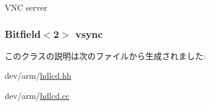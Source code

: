 \label{classHDLcd_a52d1b5d3426a30e18a452cd67d87ec13}
VNC server \hypertarget{classHDLcd_aacc2f986e357e2a77bd80683f3c976aa}{
\subsubsection[{vsync}]{\setlength{\rightskip}{0pt plus 5cm}Bitfield$<$2$>$ {\bf vsync}}}
\label{classHDLcd_aacc2f986e357e2a77bd80683f3c976aa}


このクラスの説明は次のファイルから生成されました:\begin{DoxyCompactItemize}
\item 
dev/arm/\hyperlink{hdlcd_8hh}{hdlcd.hh}\item 
dev/arm/\hyperlink{hdlcd_8cc}{hdlcd.cc}\end{DoxyCompactItemize}
